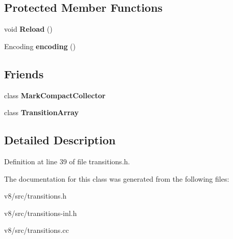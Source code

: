 \subsection*{Protected Member Functions}
\begin{DoxyCompactItemize}
\item 
\mbox{\label{classv8_1_1internal_1_1TransitionsAccessor_a47f6000558927d401ffb82b95d7175f0}} 
void {\bfseries Reload} ()
\item 
\mbox{\label{classv8_1_1internal_1_1TransitionsAccessor_ae5320a66e898f3a99139acf8139b6c65}} 
Encoding {\bfseries encoding} ()
\end{DoxyCompactItemize}
\subsection*{Friends}
\begin{DoxyCompactItemize}
\item 
\mbox{\label{classv8_1_1internal_1_1TransitionsAccessor_ae585a96455613b2bc2ae3ea75a061d8b}} 
class {\bfseries Mark\+Compact\+Collector}
\item 
\mbox{\label{classv8_1_1internal_1_1TransitionsAccessor_a84418f812b59fa163990cbcdb2f3b7a5}} 
class {\bfseries Transition\+Array}
\end{DoxyCompactItemize}


\subsection{Detailed Description}


Definition at line 39 of file transitions.\+h.



The documentation for this class was generated from the following files\+:\begin{DoxyCompactItemize}
\item 
v8/src/transitions.\+h\item 
v8/src/transitions-\/inl.\+h\item 
v8/src/transitions.\+cc\end{DoxyCompactItemize}
